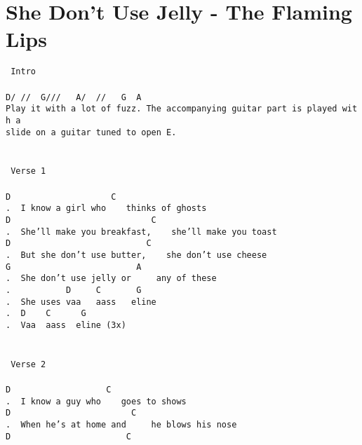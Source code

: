 \newpage
\section{She Don't Use Jelly - The Flaming Lips}
\label{She Don't Use Jelly - The Flaming Lips}
\texttt{\lbrack\ Intro\rbrack\\
\\
D/\ //\ \ G///\ \ \ A/\ \ //\ \ \ G\ \ A\\
Play\ it\ with\ a\ lot\ of\ fuzz.\ The\ accompanying\ guitar\ part\ is\ played\ with\ a\\
slide\ on\ a\ guitar\ tuned\ to\ open\ E.\\
\\
\\
\lbrack\ Verse\ 1\rbrack\\
\\
D\ \ \ \ \ \ \ \ \ \ \ \ \ \ \ \ \ \ \ \ C\\
.\ \ I\ know\ a\ girl\ who\ \ \ \ thinks\ of\ ghosts\\
D\ \ \ \ \ \ \ \ \ \ \ \ \ \ \ \ \ \ \ \ \ \ \ \ \ \ \ \ C\\
.\ \ She'll\ make\ you\ breakfast,\ \ \ \ she'll\ make\ you\ toast\\
D\ \ \ \ \ \ \ \ \ \ \ \ \ \ \ \ \ \ \ \ \ \ \ \ \ \ \ C\\
.\ \ But\ she\ don't\ use\ butter,\ \ \ \ she\ don't\ use\ cheese\\
G\ \ \ \ \ \ \ \ \ \ \ \ \ \ \ \ \ \ \ \ \ \ \ \ \ A\\
.\ \ She\ don't\ use\ jelly\ or\ \ \ \ \ any\ of\ these\\
.\ \ \ \ \ \ \ \ \ \ \ D\ \ \ \ \ C\ \ \ \ \ \ \ G\\
.\ \ She\ uses\ vaa\ \ \ aass\ \ \ eline\\
.\ \ D\ \ \ \ C\ \ \ \ \ \ G\\
.\ \ Vaa\ \ aass\ \ eline\ (3x)\\
\\
\\
\lbrack\ Verse\ 2\rbrack\\
\\
D\ \ \ \ \ \ \ \ \ \ \ \ \ \ \ \ \ \ \ C\\
.\ \ I\ know\ a\ guy\ who\ \ \ \ goes\ to\ shows\\
D\ \ \ \ \ \ \ \ \ \ \ \ \ \ \ \ \ \ \ \ \ \ \ \ C\\
.\ \ When\ he's\ at\ home\ and\ \ \ \ \ he\ blows\ his\ nose\\
D\ \ \ \ \ \ \ \ \ \ \ \ \ \ \ \ \ \ \ \ \ \ \ C\\
}
